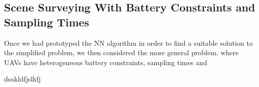 \subsection{Scene Surveying With Battery Constraints and Sampling Times}
Once we had prototyped the NN algorithm in order to find a suitable solution to the simplified problem, we then considered the more general problem, where UAVs have heterogeneous battery constraints, sampling times and 



dsakldfjslkfj
